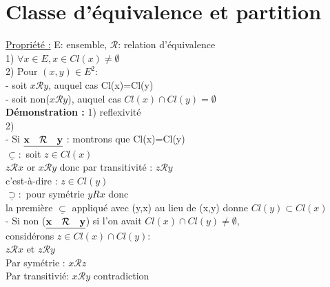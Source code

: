 \documentclass{article}
\begin{document}
     \section{Classe d'\'equivalence et partition }
     \underline{ Propri\'et\'e :}  E: ensemble, $\mathcal{R}$: relation d'\'equivalence\\
     1) $\forall x \in E, x \in Cl(x) \neq \emptyset$\\
     2) Pour $(x,y) \in E^2 :$\\
     \indent - soit $x\mathcal{R}y$, auquel cas Cl(x)=Cl(y)\\
     \indent - soit non($x\mathcal{R}y$), auquel cas $Cl(x) \cap Cl(y) = \emptyset$\\
     {\bf D\'emonstration :} 1) reflexivit\'e\\
     2) \\
     - Si $\bf \underline{x \quad \mathcal{R} \quad y}$ : montrons que Cl(x)=Cl(y)\\
     $ \underline \subset :$ soit $z \in Cl(x)$\\
     $z\mathcal{R}x$ or $x\mathcal{R}y$ donc par transitivit\'e : $z\mathcal{R}y$\\
     c'est-\`a-dire : $z \in Cl(y)$\\
     $\underline \supset :$ pour sym\'etrie $yRx$ donc\\
     la premi\`ere $\underline \subset$ appliqu\'e avec (y,x) au lieu de (x,y) donne $Cl(y)\subset Cl(x)$\\
     - Si non ($\bf \underline{x \quad\mathcal{R}\quad y}$) si l'on avait $Cl(x) \cap Cl(y) \neq \emptyset$,\\
     consid\'erons $z \in Cl(x) \cap Cl(y) :$\\
     \indent $z\mathcal{R}x $ et $z\mathcal{R}y$\\
     Par sym\'etrie : $x \mathcal{R}z$\\
     Par transitivi\'e: $x \mathcal{R} y$ contradiction\\
\end{document}

